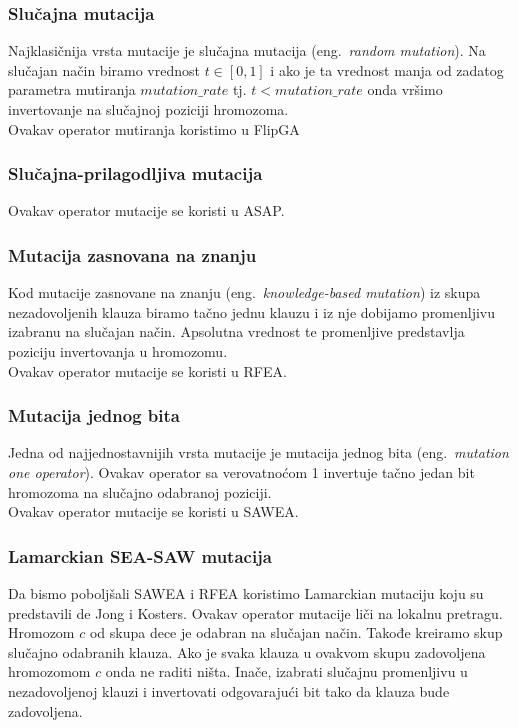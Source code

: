 \documentclass{article}
\begin{document}
\subsubsection{Slučajna mutacija}
\label{sec:ea_slucajna_mutacija}
Najklasičnija vrsta mutacije je slučajna mutacija (eng.~{\em random mutation}). Na slučajan način biramo vrednost $t \in [0,1]$ i ako je ta vrednost manja od zadatog parametra mutiranja $mutation\_rate$ tj. $ t < mutation\_rate$ onda vršimo invertovanje na slučajnoj poziciji hromozoma.\\

Ovakav operator mutiranja koristimo u  FlipGA

\subsubsection{Slučajna-prilagodljiva mutacija}
\label{sec:ea_slucajna_prilagodljiva_mutacija}

Ovakav operator mutacije se koristi u ASAP.

\subsubsection{Mutacija zasnovana na znanju}
\label{sec:ea_mutacija_znanje}
Kod mutacije zasnovane na znanju (eng.~{\em knowledge-based mutation}) iz skupa nezadovoljenih klauza biramo tačno jednu klauzu i iz nje dobijamo promenljivu izabranu na slučajan način. Apsolutna vrednost te promenljive predstavlja poziciju invertovanja u hromozomu.\\

Ovakav operator mutacije se koristi u RFEA.

\subsubsection{Mutacija jednog bita}
\label{sec:ea_mutacija_one}
Jedna od najjednostavnijih vrsta mutacije je mutacija jednog bita (eng.~{\em mutation one operator}). Ovakav operator sa verovatnoćom 1 invertuje tačno jedan bit hromozoma na slučajno odabranoj poziciji. \\

Ovakav operator mutacije se koristi u SAWEA.

\subsubsection{Lamarckian SEA-SAW mutacija}
\label{sec:ea_lamarckian}
Da bismo poboljšali SAWEA i RFEA koristimo Lamarckian mutaciju koju su predstavili de Jong i Kosters. Ovakav operator mutacije liči na lokalnu pretragu. Hromozom $c$ od skupa dece je odabran na slučajan način. Takođe kreiramo skup slučajno odabranih klauza. Ako je svaka klauza u ovakvom skupu zadovoljena hromozomom $c$ onda ne raditi ništa. Inače, izabrati slučajnu promenljivu u nezadovoljenoj klauzi i invertovati odgovarajući bit tako da klauza bude zadovoljena.
\end{document}
